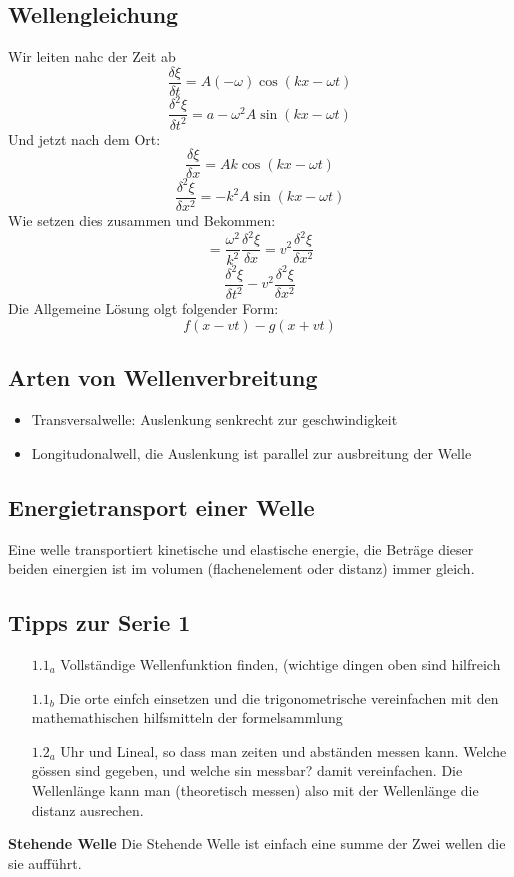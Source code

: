 \documentclass{article}
\begin{document}
\subsection{Wellengleichung}
Wir leiten nahc der Zeit ab
\[\frac{\delta\xi}{\delta t}=A(-\omega)\cos(kx-\omega t)\]
\[\frac{\delta^2 \xi}{\delta t^2}=a-\omega^2A\sin(kx-\omega t)\]
Und jetzt nach dem Ort:
\[\frac{\delta\xi}{\delta x}=Ak\cos(kx-\omega t)\]
\[\frac{\delta^2 \xi}{\delta x^2}=-k^2A\sin(kx-\omega t)\]
Wie setzen dies zusammen und Bekommen:
\[=\frac{\omega^2}{k^2}\frac{\delta^2\xi}{\delta x}=v^2\frac{\delta^2\xi}{\delta x^2}\]
\[\frac{\delta^2 \xi}{\delta t^2}-v^2\frac{\delta^2\xi}{\delta x^2}\]
Die Allgemeine Lösung olgt folgender Form:
\[f(x-vt)-g(x+vt)\]
\subsection{Arten von Wellenverbreitung}
\begin{itemize}
\item{Transversalwelle: Auslenkung senkrecht zur geschwindigkeit}
\item{Longitudonalwell, die Auslenkung ist parallel zur ausbreitung der Welle}
\end{itemize}
\subsection{Energietransport einer Welle}
Eine welle transportiert kinetische und elastische energie, die Beträge dieser beiden einergien ist im volumen (flachenelement oder distanz) immer gleich.
\subsection{Tipps zur Serie 1}
\begin{itemize}
\item[$1.1_a$]{Vollständige Wellenfunktion finden, (wichtige dingen oben sind hilfreich}
\item[$1.1_b$]{Die orte einfch einsetzen und die trigonometrische vereinfachen mit den mathemathischen hilfsmitteln der formelsammlung}
\item[$1.2_a$]{Uhr und Lineal, so dass man zeiten und abständen messen kann. Welche gössen sind gegeben, und welche sin messbar? damit vereinfachen. Die Wellenlänge kann man (theoretisch messen) also mit der Wellenlänge die distanz ausrechen.}
\end{itemize}
\textbf{Stehende Welle} Die Stehende Welle ist einfach eine summe der Zwei wellen die sie aufführt.
\end{document}
